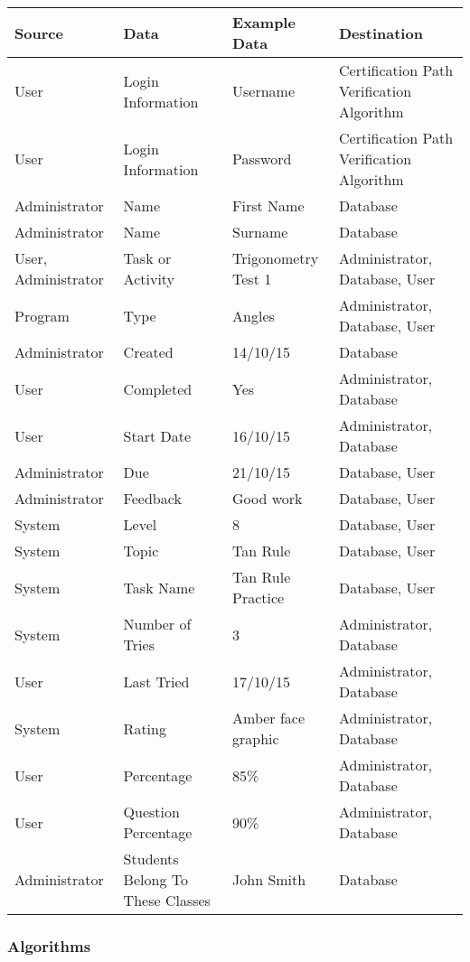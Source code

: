\begin{center}
\begin{tabular}{|p{3cm}|p{3cm}|p{3cm}|p{3cm}|}
\hline
\textbf{Source} & \textbf{Data} & \textbf{Example Data} & \textbf{Destination} \\ \hline
User & Login Information & Username & Certification Path Verification Algorithm \\ \hline
User & Login Information & Password & Certification Path Verification Algorithm \\ \hline
Administrator & Name & First Name & Database \\ \hline
Administrator & Name & Surname & Database \\ \hline
User, Administrator & Task or Activity & Trigonometry Test 1 & Administrator, Database, User \\ \hline
Program & Type & Angles & Administrator, Database, User \\ \hline
Administrator & Created & 14/10/15 & Database \\ \hline
User & Completed & Yes & Administrator, Database \\ \hline
User & Start Date & 16/10/15 & Administrator, Database \\ \hline
Administrator & Due & 21/10/15 & Database, User \\ \hline
Administrator & Feedback & Good work & Database, User \\ \hline
System & Level & 8 & Database, User \\ \hline
System & Topic & Tan Rule & Database, User \\ \hline
System & Task Name & Tan Rule Practice & Database, User \\ \hline
System & Number of Tries & 3 &Administrator, Database \\ \hline
User & Last Tried & 17/10/15 & Administrator, Database \\ \hline
System & Rating & Amber face graphic & Administrator, Database \\ \hline
User & Percentage & 85\% & Administrator, Database \\ \hline
User & Question Percentage & 90\% & Administrator, Database \\ \hline
Administrator & Students Belong To These Classes & John Smith & Database \\ \hline
\end{tabular}
\end{center}

\subsubsection{Algorithms}


